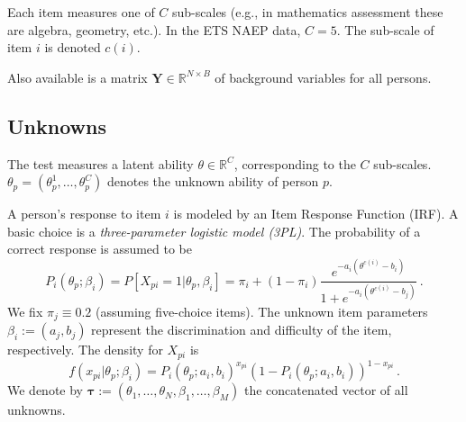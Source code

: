 \documentclass{article}
\newcommand{\R}{\mathbb{R}}
\newcommand{\bY}{\mathbf{Y}}
\newcommand{\bt}{\boldsymbol\tau}
\newcommand{\ta}{\theta}
\begin{document}
Each item measures one of $C$ sub-scales (e.g., in mathematics assessment these are algebra, geometry, etc.). In the ETS NAEP data, $C=5$. The sub-scale of item $i$ is denoted $c(i)$.

Also available is a matrix $\bY \in \R^{N \times B}$ of background variables for all persons.

\subsection{Unknowns}
The test measures a latent ability $\ta \in \R^C$, corresponding to the $C$ sub-scales. $\ta_p=(\ta_p^1,\dots,\ta_p^C)$ denotes the unknown ability of person $p$.

A person's response to item $i$ is modeled by an Item Response Function (IRF). A basic choice is a {\it three-parameter logistic model (3PL)}. The probability of a correct response is assumed to be
\begin{equation}
  P_i(\ta_p; \beta_i) = P[X_{pi} = 1 | \ta_p,\beta_i] = \pi_i + (1-\pi_i) \frac{e^{-a_i (\ta^{c(i)} - b_i)}}{1 + e^{-a_i (\ta^{c(i)} - b_j)}}\,.
\end{equation}
We fix $\pi_j \equiv 0.2$ (assuming five-choice items). The unknown item parameters $\beta_i := (a_j, b_j)$ represent the discrimination and difficulty of the item, respectively. The density for $X_{pi}$ is
\begin{equation}
  f(x_{pi}|\ta_p;\beta_i) = P_i(\ta_p;a_i,b_i)^{x_{pi}} \left(1 - P_i(\ta_p;a_i,b_i)\right)^{1-x_{pi}}\,.
\end{equation}
We denote by $\bt := (\ta_1, \dots, \ta_N, \beta_1, \dots, \beta_M)$ the concatenated vector of all unknowns.
\end{document}
